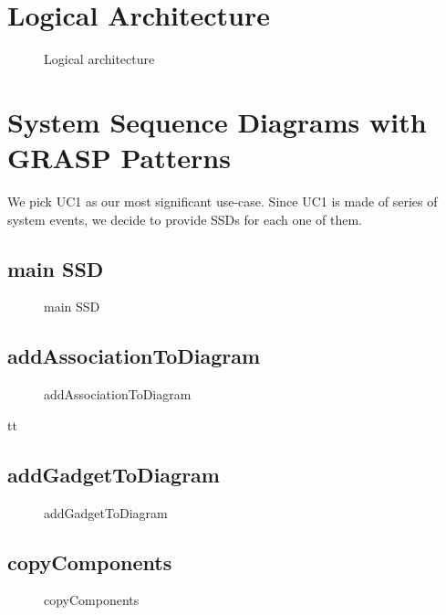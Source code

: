 \documentclass[12pt]{article}
\begin{document}



    \section{Logical Architecture}

    \begin{figure}[H]
        \centering
        
        \caption{Logical architecture}
    \end{figure}


    \section{System Sequence Diagrams with GRASP Patterns}
    We pick UC1 as our most significant use-case. Since UC1 is made of series of system events, we decide to provide SSDs for each one of them.

    \subsection{main SSD}
    \begin{figure}[H]
        \centering
        
        \caption{main SSD}
    \end{figure}

    \subsection{addAssociationToDiagram}
    \begin{figure}[H]
        \centering
        
        \caption{addAssociationToDiagram}
    \end{figure}

    tt\subsection{addGadgetToDiagram}
    \begin{figure}[H]
        \centering
        
        \caption{addGadgetToDiagram}
    \end{figure}

    \subsection{copyComponents}
    \begin{figure}[H]
        \centering
        
        \caption{copyComponents}
    \end{figure}
\end{document}
